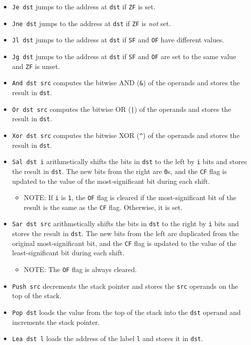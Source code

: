 \documentclass{article}
\begin{document}
{\begin{itemize}
  \item \texttt{Je dst} jumps to the address at \texttt{dst} if \texttt{ZF} is
    set.
  \item \texttt{Jne dst} jumps to the address at \texttt{dst} if \texttt{ZF} is
    \emph{not} set.
  \item \texttt{Jl dst} jumps to the address at \texttt{dst} if \texttt{SF} and
    \texttt{OF} have different values.
  \item \texttt{Jg dst} jumps to the address at \texttt{dst} if \texttt{SF} and
    \texttt{OF} are set to the same value and \texttt{ZF} is unset.
  \item \texttt{And dst src} computes the bitwise AND (\texttt{\&{}}) of the
    operands and stores the result in \texttt{dst}.
  \item \texttt{Or dst src} computes the bitwise OR (\texttt{|}) of the operands
    and stores the result in \texttt{dst}.
  \item \texttt{Xor dst src} computes the bitwise XOR (\texttt{\^{}}) of the
    operands and stores the result in \texttt{dst}.
  \item \texttt{Sal dst i} arithmetically shifts the bits in \texttt{dst} to the
    left by \texttt{i} bits and stores the result in \texttt{dst}. The new bits
    from the right are \texttt{0}s, and the \texttt{CF} flag is updated to the
    value of the most-significant bit during each shift.
    \begin{itemize}
    \item NOTE: If \texttt{i} is \texttt{1}, the \texttt{OF} flag is cleared if
      the most-significant bit of the result is the same as the \texttt{CF}
      flag. Otherwise, it is set.
    \end{itemize}
  \item \texttt{Sar dst src} arithmetically shifts the bits in \texttt{dst} to
    the right by \texttt{i} bits and stores the result in \texttt{dst}. The new
    bits from the left are duplicated from the original most-significant bit,
    and the \texttt{CF} flag is updated to the value of the least-significant
    bit during each shift.
    \begin{itemize}
    \item NOTE: The \texttt{OF} flag is always cleared.
    \end{itemize}
  \item \texttt{Push src} decrements the stack pointer and stores the
    \texttt{src} operands on the top of the stack.
  \item \texttt{Pop dst} loads the value from the top of the stack into the
    \texttt{dst} operand and increments the stack pointer.
  \item \texttt{Lea dst l} loads the address of the label \texttt{l} and stores
    it in \texttt{dst}.
  \end{itemize}
}
\end{document}
